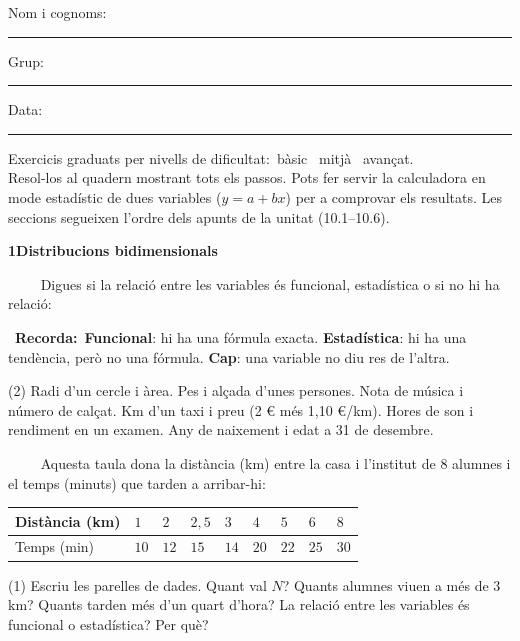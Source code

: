 \documentclass[11pt,a4paper]{article}
\newcommand{\estrelles}[1]{{\color{accent}\ifcase#1\or\faStar\faStar[regular]\faStar[regular]\or\faStar\faStar\faStar[regular]\or\faStar\faStar\faStar\fi}}
\newcounter{exer}
\newcommand{\ex}[1]{\par\needspace{4\baselineskip}\medskip\stepcounter{exer}\noindent{\color{navy}\bfseries\theexer.}\ \ {\small\estrelles{#1}}\ \ }
\newcommand{\seccio}[2]{\par\needspace{10\baselineskip}\bigskip
  \begin{tcolorbox}[colback=navy,colframe=navy,coltext=white,arc=2mm,boxrule=0pt,left=3mm,right=3mm,top=1.2mm,bottom=1.2mm]
  {\large\bfseries #1\quad #2}
  \end{tcolorbox}\vspace{-2pt}}
\newcommand{\recorda}[1]{\par\smallskip\begin{tcolorbox}[colback=accent!7,colframe=accent!55,arc=2mm,boxrule=0.5pt,left=2.5mm,right=2.5mm,top=1mm,bottom=1mm]\small{\color{accent}\faLightbulb[regular]}\ \textbf{Recorda:}\ #1\end{tcolorbox}}
\begin{document}
\thispagestyle{primera}

\vspace{10pt}
Nom i cognoms: \rule{8.4cm}{0.4pt}\hfill Grup: \rule{1.6cm}{0.4pt}\hfill Data: \rule{2.2cm}{0.4pt}
\vspace{8pt}

\begin{tcolorbox}[colback=soft,colframe=soft,arc=2mm,left=3mm,right=3mm,top=1.5mm,bottom=1.5mm]
\small Exercicis graduats per nivells de dificultat:\quad \estrelles{1}\ bàsic \qquad \estrelles{2}\ mitjà \qquad \estrelles{3}\ avançat.\\[2pt] Resol-los al quadern mostrant tots els passos. Pots fer servir la calculadora en mode estadístic de dues variables ($y=a+bx$) per a comprovar els resultats. Les seccions segueixen l'ordre dels apunts de la unitat (10.1--10.6).
\end{tcolorbox}

\seccio{1}{Distribucions bidimensionals}

\ex{1} Digues si la relació entre les variables és funcional, estadística o si no hi ha relació:\recorda{\textbf{Funcional}: hi ha una fórmula exacta. \textbf{Estadística}: hi ha una tendència, però no una fórmula. \textbf{Cap}: una variable no diu res de l'altra.}\begin{tasks}(2)
  \task Radi d'un cercle i àrea.
  \task Pes i alçada d'unes persones.
  \task Nota de música i número de calçat.
  \task Km d'un taxi i preu (2 € més 1,10 €/km).
  \task Hores de son i rendiment en un examen.
  \task Any de naixement i edat a 31 de desembre.
\end{tasks}

\ex{1} Aquesta taula dona la distància (km) entre la casa i l'institut de 8 alumnes i el temps (minuts) que tarden a arribar-hi:\par\smallskip\begin{center}{\renewcommand{\arraystretch}{1.3}\begin{tabular}{|l|C{0.8cm}|C{0.8cm}|C{0.8cm}|C{0.8cm}|C{0.8cm}|C{0.8cm}|C{0.8cm}|C{0.8cm}|}\hline Distància (km) & $1$ & $2$ & $2{,}5$ & $3$ & $4$ & $5$ & $6$ & $8$\\\hline Temps (min) & $10$ & $12$ & $15$ & $14$ & $20$ & $22$ & $25$ & $30$\\\hline\end{tabular}}\end{center}\begin{tasks}(1)
  \task Escriu les parelles de dades. Quant val $N$?
  \task Quants alumnes viuen a més de 3 km? Quants tarden més d'un quart d'hora?
  \task La relació entre les variables és funcional o estadística? Per què?
\end{tasks}
\end{document}
